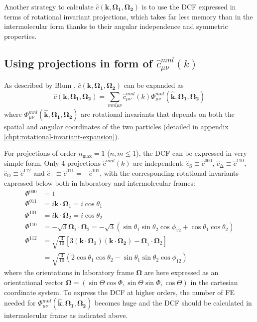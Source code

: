 Another strategy to calculate $\hat{c}(\mathbf{k},\mathbf{\Omega_{1}},\mathbf{\Omega_{2}})$
is to use the DCF expressed in terms of rotational invariant projections,
which takes far less memory than in the intermolecular form thanks
to their angular independence and symmetric properties. 

\subsection{Using projections in form of $\hat{c}_{\mu\nu}^{mnl}(k)$\label{subsec:Using-projections-in}}

As described by Blum \citep{Blum_I,Blum_II}, $\hat{c}(\mathbf{k},\mathbf{\Omega_{1}},\mathbf{\Omega_{2}})$
can be expanded as
\begin{equation}
\hat{c}(\mathbf{k},\mathbf{\Omega_{1}},\mathbf{\Omega_{2}})=\sum_{mnl\mu\nu}\hat{c}_{\mu\nu}^{mnl}(k)\Phi_{\mu\nu}^{mnl}(\mathbf{\hat{k}},\mathbf{\Omega_{1}},\mathbf{\Omega_{2}})
\end{equation}
where $\Phi_{\mu\nu}^{mnl}(\mathbf{\hat{k}},\mathbf{\Omega_{1}},\mathbf{\Omega_{2}})$
are rotational invariants that depends on both the spatial and angular
coordinates of the two particles (detailed in appendix \ref{chpt:rotational-invariant-expansion}).

For projections of order $n_{\mathrm{max}}=1$ ($n,m\leq1$), the
DCF can be expressed in very simple form. Only 4 projections $\hat{c}^{mnl}(k)$
are independent: $\hat{c}_{\mathrm{S}}\equiv\hat{c}^{000}$, $\hat{c}_{\mathrm{\Delta}}\equiv\hat{c}^{110}$,
$\hat{c}_{\mathrm{D}}\equiv\hat{c}^{112}$ and $\hat{c}_{+}\equiv\hat{c}^{011}=-\hat{c}^{101}$,
with the corresponding rotational invariants expressed below both
in laboratory and intermolecular frames:
\begin{align}
\Phi^{000} & =1\nonumber \\
\Phi^{011} & =i\mathbf{k}\cdot\mathbf{\Omega}_{1}=i\cos\theta_{1}\nonumber \\
\Phi^{101} & =i\mathbf{k}\cdot\mathbf{\Omega}_{2}=i\cos\theta_{2}\nonumber \\
\Phi^{110} & =-\sqrt{3}\mathbf{\Omega}_{1}\cdot\mathbf{\Omega}_{2}=-\sqrt{3}(\sin\theta_{1}\sin\theta_{2}\cos\phi_{12}+\cos\theta_{1}\cos\theta_{2})\nonumber \\
\Phi^{112} & =\sqrt{\frac{3}{10}}\left[3\mathbf{(\mathbf{k}\cdot\mathbf{\Omega}_{1})(\mathbf{k}\cdot\mathbf{\Omega}_{2})-\Omega}_{1}\cdot\mathbf{\Omega}_{2}\right]\\
 & =\sqrt{\frac{3}{10}}\left(2\cos\theta_{1}\cos\theta_{2}-\sin\theta_{1}\sin\theta_{2}\cos\phi_{12}\right)\nonumber 
\end{align}
where the orientations in laboratory frame $\mathbf{\Omega}$ are
here expressed as an orientational vector $\mathbf{\Omega}=(\sin\Theta\cos\Phi,\sin\Theta\sin\Phi,\cos\Theta)$
in the cartesian coordinate system. To express the DCF at higher orders,
the number of FE needed for $\Phi_{\mu\nu}^{mnl}(\mathbf{\hat{k}},\mathbf{\Omega_{1}},\mathbf{\Omega_{2}})$
becomes huge and the DCF should be calculated in intermolecular frame
as indicated above.


